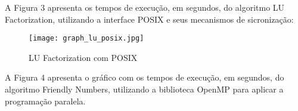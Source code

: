 \documentclass[12pt]{article}
\begin{document}

A Figura 3 apresenta os tempos de execução, em segundos, do algoritmo LU Factorization, utilizando a interface POSIX e seus mecanismos de sicronização:

\begin{figure}[h!]
  \centering
  \texttt{[image: graph\_lu\_posix.jpg]}
  \caption{LU Factorization com POSIX}
  \label{fig:LU POSIX}
\end{figure}



A Figura 4 apresenta o gráfico com os tempos de execução, em segundos, do algoritmo Friendly Numbers, utilizando a biblioteca OpenMP para aplicar a programação paralela.
\end{document}
